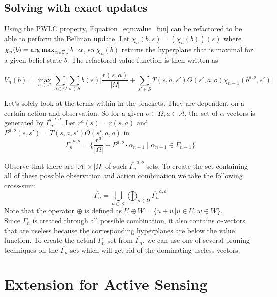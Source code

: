 \subsection{Solving with exact updates}
Using the PWLC property, Equation~\ref{eqn:value_fun} can be refactored to be able to perform the Bellman update. Let $\chi_n(b,s)=(\chi_n(b))(s)$ where $\chi_n(b)=\operatorname*{arg\,max}_{\alpha\in \Gamma_n} b\cdot\alpha$, so $\chi_n(b)$ returns the hyperplane that is maximal for a given belief state $b$. The refactored value function is then written as 

\begin{equation}
	V_n(b) = \max_{a\in \mathcal{A}}\sum_{o\in \Omega}\sum_{s\in S}b(s)\big[\frac{r(s,a)}{|\Omega|} + \sum_{s'\in S}T(s,a,s')O(s',a,o)\chi_{n-1}(b^{a,o},s')\big]
\end{equation}

Let’s solely look at the terms within in the brackets. They are dependent on a certain action and observation. So for a given $o\in\Omega, a\in\mathcal{A}$, the set of $\alpha$-vectors is generated by $\overline{\Gamma_n}^{a,o}$. Let $r^a(s)=r(s,a)$ and $P^{a,o}(s,s')=T(s,a,s')O(s',a,o)$ in 
\begin{equation}
	\overline{\Gamma_n}^{a,o}=\{ \frac{r^a}{|\Omega|}+P^{a,o}\cdot\alpha_{n-1}\mid\alpha_{n-1}\in\Gamma_{n-1} \}
\end{equation}

Observe that there are $|\mathcal{A}|\times|\Omega|$ of such $\overline{\Gamma_n}^{a,o}$ sets. To create the set containing all
of these possible observation and action combination we take the following cross-sum:
\begin{equation}
	\overline{\Gamma_n} = \bigcup_{a\in\mathcal{A}}\bigoplus_{o\in \Omega}\overline{\Gamma_n}^{a,o}
\end{equation}
Note that the operator $\oplus$ is defined as $U \oplus W = \{u + w | u \in U, w \in W\}$.\\

Since $\overline{\Gamma_n}$ is created through all possible combination, it also contains $\alpha$-vectors that are useless because the corresponding hyperplanes are below the value function. To create the actual $\Gamma_n$ set from $\overline{\Gamma_n}$, we can use one of several pruning techniques on the $\overline{\Gamma_n}$ set which will get rid of the dominating useless vectors.

\section{Extension for Active Sensing}

